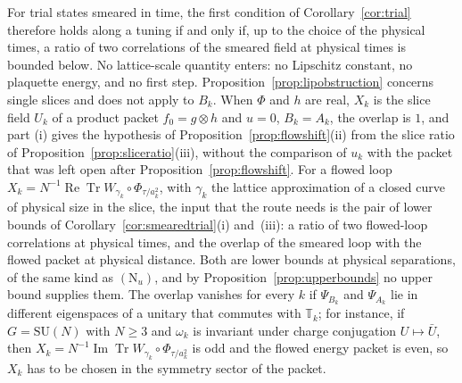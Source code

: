 \documentclass[aps,prd,twocolumn,superscriptaddress,nofootinbib,longbibliography,floatfix,amsmath,amssymb,10pt]{revtex4-2}
\theoremstyle{definition}
\theoremstyle{remark}
\newcommand{\SU}{\mathrm{SU}}
\newcommand{\Tr}{\operatorname{Tr}}
\newcommand{\ReTr}{\operatorname{Re}\operatorname{Tr}}
\begin{document}
For trial states smeared in time, the first condition of
Corollary~\ref{cor:trial} therefore holds along a tuning if and only if,
up to the choice of the physical times, a ratio of two correlations of the
smeared field at physical times is bounded below. No lattice-scale quantity
enters: no Lipschitz constant, no plaquette energy, and no first step.
Proposition~\ref{prop:lipobstruction} concerns single slices and does not
apply to $B_k$. When $\Phi$ and $h$ are real, $X_k$ is the slice field $U_k$ of a product packet
$f_0=g\otimes h$ and $u=0$, $B_k=A_k$, the overlap is $1$, and part (i)
gives the hypothesis of Proposition~\ref{prop:flowshift}(ii) from the slice
ratio of Proposition~\ref{prop:sliceratio}(iii), without the comparison of
$u_k$ with the packet that was left open after
Proposition~\ref{prop:flowshift}. For a flowed loop $X_k=N^{-1}\ReTr
W_{\gamma_k}\circ\Phi_{\tau/a_k^2}$, with $\gamma_k$ the lattice
approximation of a closed curve of physical size in the slice, the input
that the route needs is the pair of lower bounds of
Corollary~\ref{cor:smearedtrial}(i) and~(iii): a ratio of two flowed-loop
correlations at physical times, and the overlap of the smeared loop with
the flowed packet at physical distance. Both are lower bounds at physical
separations, of the same kind as $(\mathrm N_u)$, and by
Proposition~\ref{prop:upperbounds} no upper bound supplies them. The overlap
vanishes for every $k$ if $\Psi_{B_k}$ and $\Psi_{A_k}$ lie in different
eigenspaces of a unitary that commutes with $\mathbb T_k$; for instance, if
$G=\SU(N)$ with $N\ge3$ and $\omega_k$ is invariant under charge
conjugation $U\mapsto\bar U$, then $X_k=N^{-1}\operatorname{Im}\Tr
W_{\gamma_k}\circ\Phi_{\tau/a_k^2}$ is odd and the flowed energy packet is
even, so $X_k$ has to be chosen in the symmetry sector of the packet.
\end{document}

